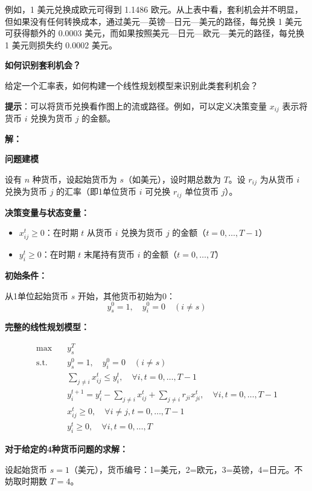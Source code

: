 \documentclass[12pt,a4paper]{article}
\begin{document}
例如，1 美元兑换成欧元可得到 1.1486 欧元。从上表中看，套利机会并不明显，但如果没有任何转换成本，通过美元—英镑—日元—美元的路径，每兑换 1 美元可获得额外的 0.0003 美元，而如果按照美元—日元—欧元—美元的路径，每兑换 1 美元则损失约 0.0002 美元。

\textbf{如何识别套利机会？}

给定一个汇率表，如何构建一个线性规划模型来识别此类套利机会？

\textbf{提示}：可以将货币兑换看作图上的流或路径。例如，可以定义决策变量 \( x_{ij} \) 表示将货币 \( i \) 兑换为货币 \( j \) 的金额。

\textbf{解：}

\textbf{问题建模}

设有 $n$ 种货币，设起始货币为 $s$（如美元），设时期总数为 $T$。设 $r_{ij}$ 为从货币 $i$ 兑换为货币 $j$ 的汇率（即1单位货币 $i$ 可兑换 $r_{ij}$ 单位货币 $j$）。

\textbf{决策变量与状态变量：}

\begin{itemize}
    \item $x_{ij}^t \geq 0$：在时期 $t$ 从货币 $i$ 兑换为货币 $j$ 的金额（$t=0,\ldots,T-1$）
    \item $y_i^t \geq 0$：在时期 $t$ 末尾持有货币 $i$ 的金额（$t=0,\ldots,T$）
\end{itemize}

\textbf{初始条件：}

从1单位起始货币 $s$ 开始，其他货币初始为0：
\[
y_s^0 = 1, \quad y_i^0 = 0 \quad (i \neq s)
\]

\textbf{完整的线性规划模型：}

\begin{align*}
\max \quad & y_s^T \\
\text{s.t.} \quad & y_s^0 = 1, \quad y_i^0 = 0 \quad (i \neq s) \\
& \sum_{j \neq i} x_{ij}^t \leq y_i^t, \quad \forall i, t=0,\ldots,T-1 \\
& y_i^{t+1} = y_i^t - \sum_{j \neq i} x_{ij}^t + \sum_{j \neq i} r_{ji} x_{ji}^t, \quad \forall i, t=0,\ldots,T-1 \\
& x_{ij}^t \geq 0, \quad \forall i \neq j, t=0,\ldots,T-1 \\
& y_i^t \geq 0, \quad \forall i, t=0,\ldots,T
\end{align*}

\textbf{对于给定的4种货币问题的求解：}

设起始货币 $s = 1$（美元），货币编号：1=美元，2=欧元，3=英镑，4=日元。不妨取时期数 $T = 4$。
\end{document}
